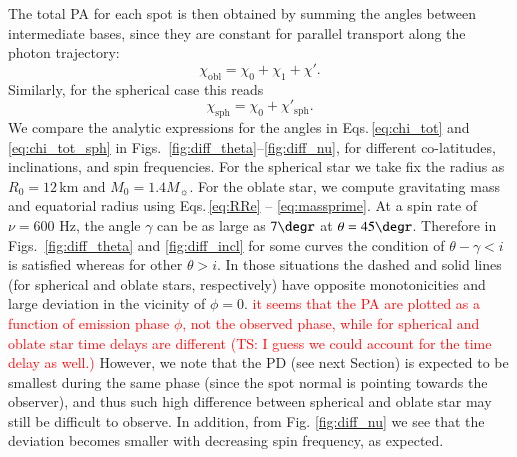 \documentclass{aa}
\newcommand{\be}{\begin{equation}}
\newcommand{\ee}{\end{equation}}
\newcommand{\red}[1]{\textcolor{red}{#1}}
\newcommand{\msun}{{M}_{\sun}}
\begin{document}
The total PA for each spot is then obtained by summing the angles between intermediate bases, since they are constant for parallel transport along the photon trajectory: 
\be\label{eq:chi_tot}
\chi_{\mathrm{obl}}=\chi_0+\chi_1+ \chi'.
\ee
Similarly, for the spherical case this reads
\be\label{eq:chi_tot_sph}
\chi_{\mathrm{sph}}=\chi_0+\chi'_{\mathrm{sph}}.
\ee
We compare the analytic expressions for the angles in Eqs.\,\eqref{eq:chi_tot} and \eqref{eq:chi_tot_sph} in Figs.~\ref{fig:diff_theta}--\ref{fig:diff_nu}, for different co-latitudes, inclinations, and spin frequencies.
For the spherical star we take fix the radius as $R_0=12$\,km and $M_0=1.4\msun$. 
For the oblate star, we compute gravitating mass and equatorial radius using  Eqs.\,\eqref{eq:RRe} -- \eqref{eq:massprime}.
At a spin rate of $\nu = 600$ Hz, the angle $\gamma$ can be as large as $7\degr$ at $\theta = 45\degr$.
Therefore in Figs.~\ref{fig:diff_theta} and \ref{fig:diff_incl} for some curves the condition of $\theta-\gamma < i$ is satisfied whereas for other $\theta>i$. 
In those situations the dashed and solid lines (for spherical and oblate stars, respectively) have opposite monotonicities and large deviation in the vicinity of $\phi=0$. 
\red{it seems that the PA are plotted as a function of emission phase $\phi$, not 
the observed phase, while for spherical and oblate star time delays are different}
\red{(TS: I guess we could account for the time delay as well.)}
However, we note that the PD (see next Section) is expected to be smallest during the same phase (since the spot normal is pointing towards the observer), and thus such high difference between spherical and oblate star may still be difficult to observe.
In addition, from Fig. \ref{fig:diff_nu} we see that the deviation becomes smaller with decreasing spin frequency, as expected.
\end{document}
